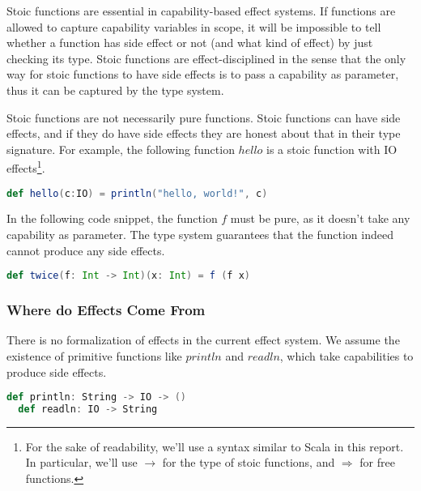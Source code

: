 Stoic functions are essential in capability-based effect systems. If
functions are allowed to capture capability variables in scope, it
will be impossible to tell whether a function has side effect or not
(and what kind of effect) by just checking its type. Stoic functions
are effect-disciplined in the sense that the only way for stoic
functions to have side effects is to pass a capability as parameter,
thus it can be captured by the type system.

Stoic functions are not necessarily pure functions. Stoic functions
can have side effects, and if they do have side effects they are
honest about that in their type signature. For example, the following
function $hello$ is a stoic function with IO effects\footnote{For the
  sake of readability, we'll use a syntax similar to Scala in this
  report. In particular, we'll use $\to$ for the type of stoic
  functions, and $\Rightarrow$ for free functions.}.

\begin{lstlisting}[language=Scala]
  def hello(c:IO) = println("hello, world!", c)
\end{lstlisting}

In the following code snippet, the function $f$ must be pure, as it
doesn't take any capability as parameter. The type system guarantees
that the function indeed cannot produce any side effects.

\begin{lstlisting}[language=Scala]
  def twice(f: Int -> Int)(x: Int) = f (f x)
\end{lstlisting}


\subsubsection{Where do Effects Come From}

There is no formalization of effects in the current effect system. We
assume the existence of primitive functions like $println$ and
$readln$, which take capabilities to produce side effects.

\begin{lstlisting}[language=Scala]
  def println: String -> IO -> ()
  def readln: IO -> String
\end{lstlisting}



